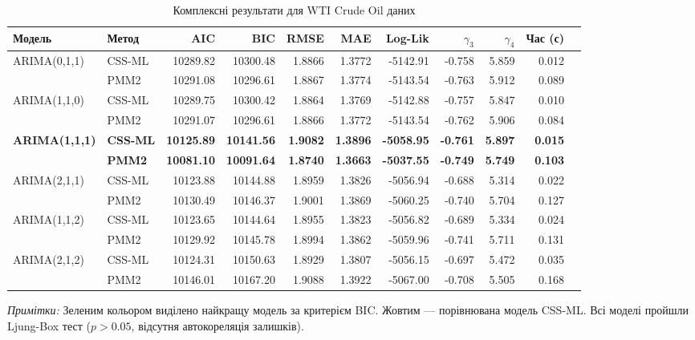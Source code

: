 \begin{table}[htbp]
\centering
\footnotesize
\caption{Комплексні результати для WTI Crude Oil даних}
\label{tab:wti_comprehensive_results}
\begin{tabular}{@{}llrrrrrrrrr@{}}
\toprule
\textbf{Модель} & \textbf{Метод} & \textbf{AIC} & \textbf{BIC} & \textbf{RMSE} & \textbf{MAE} & \textbf{Log-Lik} & $\gamma_3$ & $\gamma_4$ & \textbf{Час (с)} \\
\midrule
ARIMA(0,1,1) & CSS-ML & 10289.82 & 10300.48 & 1.8866 & 1.3772 & -5142.91 & -0.758 & 5.859 & 0.012 \\
             & PMM2   & 10291.08 & 10296.61 & 1.8867 & 1.3774 & -5143.54 & -0.763 & 5.912 & 0.089 \\
\midrule
ARIMA(1,1,0) & CSS-ML & 10289.75 & 10300.42 & 1.8864 & 1.3769 & -5142.88 & -0.757 & 5.847 & 0.010 \\
             & PMM2   & 10291.07 & 10296.61 & 1.8866 & 1.3772 & -5143.54 & -0.762 & 5.906 & 0.084 \\
\midrule
\rowcolor{yellow!20}
\textbf{ARIMA(1,1,1)} & \textbf{CSS-ML} & \textbf{10125.89} & \textbf{10141.56} & \textbf{1.9082} & \textbf{1.3896} & \textbf{-5058.95} & \textbf{-0.761} & \textbf{5.897} & \textbf{0.015} \\
\rowcolor{green!20}
             & \textbf{PMM2}   & \textbf{10081.10} & \textbf{10091.64} & \textbf{1.8740} & \textbf{1.3663} & \textbf{-5037.55} & \textbf{-0.749} & \textbf{5.749} & \textbf{0.103} \\
\midrule
ARIMA(2,1,1) & CSS-ML & 10123.88 & 10144.88 & 1.8959 & 1.3826 & -5056.94 & -0.688 & 5.314 & 0.022 \\
             & PMM2   & 10130.49 & 10146.37 & 1.9001 & 1.3869 & -5060.25 & -0.740 & 5.704 & 0.127 \\
\midrule
ARIMA(1,1,2) & CSS-ML & 10123.65 & 10144.64 & 1.8955 & 1.3823 & -5056.82 & -0.689 & 5.334 & 0.024 \\
             & PMM2   & 10129.92 & 10145.78 & 1.8994 & 1.3862 & -5059.96 & -0.741 & 5.711 & 0.131 \\
\midrule
ARIMA(2,1,2) & CSS-ML & 10124.31 & 10150.63 & 1.8929 & 1.3807 & -5056.15 & -0.697 & 5.472 & 0.035 \\
             & PMM2   & 10146.01 & 10167.20 & 1.9088 & 1.3922 & -5067.00 & -0.708 & 5.505 & 0.168 \\
\bottomrule
\end{tabular}
\end{table}

\noindent\textit{Примітки:} Зеленим кольором виділено найкращу модель за критерієм BIC. Жовтим --- порівнювана модель CSS-ML. Всі моделі пройшли Ljung-Box тест ($p > 0.05$, відсутня автокореляція залишків).

